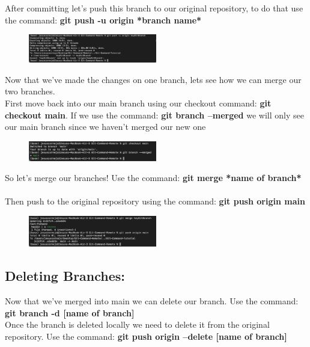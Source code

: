 \documentclass[10pt,twocolumn]{article}
\begin{document}
After committing let's push this branch to our original repository, to do that use the command: \textbf{git push -u origin *branch name*}

\begin{figure}[h!]
\center
\includegraphics[width=0.5\textwidth]{screenshots/sc12.png}
\end{figure}

Now that we've made the changes on one branch, lets see how we can merge our two branches.\\
First move back into our main branch using our checkout command: \textbf{git checkout main}. If we use the command: \textbf{git branch --merged} we will only see our main branch since we haven’t merged our new one\\

\begin{figure}[h!]
\center
\includegraphics[width=0.5\textwidth]{screenshots/sc13.png}
\end{figure}

So let's merge our branches! Use the command: \textbf{git merge *name of branch*}\\ \\
Then push to the original repository using the command: \textbf{git push origin main}

\begin{figure}[h!]
\center
\includegraphics[width=0.5\textwidth]{screenshots/sc14.png}
\end{figure}

\subsection{Deleting Branches:}
Now that we've merged into main we can delete our branch. Use the command: \textbf{git branch -d [name of branch]}\\
Once the branch is deleted locally we need to delete it from the original repository. Use the command: \textbf{git push origin --delete [name of branch]} \\
\end{document}
